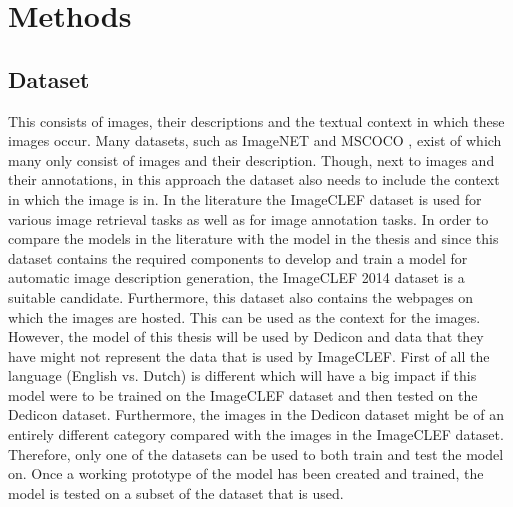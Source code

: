 \section{Methods}

\subsection{Dataset}
This consists of images, their descriptions and the textual context in which these images occur. Many datasets, such as ImageNET \cite{Russakovsky2012} and MSCOCO \cite{Lin2014}, exist of which many only consist of images and their description. Though, next to images and their annotations, in this approach the dataset also needs to include the context in which the image is in. In the literature the ImageCLEF dataset is used for various image retrieval tasks as well as for image annotation tasks. In order to compare the models in the literature with the model in the thesis and since this dataset contains the required components to develop and train a model for automatic image description generation, the ImageCLEF 2014 dataset is a suitable candidate. Furthermore, this dataset also contains the webpages on which the images are hosted. This can be used as the context for the images. However, the model of this thesis will be used by Dedicon and data that they have might not represent the data that is used by ImageCLEF. First of all the language (English vs. Dutch) is different which will have a big impact if this model were to be trained on the ImageCLEF dataset and then tested on the Dedicon dataset. Furthermore, the images in the Dedicon dataset might be of an entirely different category compared with the images in the ImageCLEF dataset. Therefore, only one of the datasets can be used to both train and test the model on. Once a working prototype of the model has been created and trained, the model is tested on a subset of the dataset that is used. 
